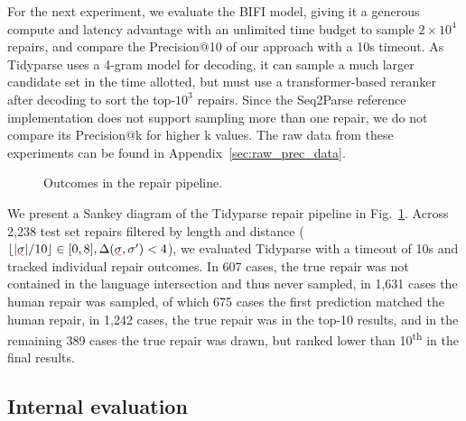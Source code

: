 \documentclass[sigplan,review,acmsmall,nonacm,screen,anonymous]{acmart}\settopmatter{printfolios=false,printccs=false,printacmref=false}
\begin{document}
For the next experiment, we evaluate the BIFI model, giving it a generous compute and latency advantage with an unlimited time budget to sample $2\times10^4$ repairs, and compare the Precision@10 of our approach with a 10s timeout. As Tidyparse uses a 4-gram model for decoding, it can sample a much larger candidate set in the time allotted, but must use a transformer-based reranker after decoding to sort the top-$10^3$ repairs. Since the Seq2Parse reference implementation does not support sampling more than one repair, we do not compare its Precision@k for higher k values. The raw data from these experiments can be found in Appendix~\ref{sec:raw_prec_data}.

\begin{figure}
\vspace{-1.13cm}
\begin{center}\resizebox{.43\textwidth}{!}{\hspace{-0.6cm}}\end{center}
\vspace{-1.1cm}
\caption{Outcomes in the repair pipeline.}
\label{fig:sankey}
\end{figure}

\noindent We present a Sankey diagram of the Tidyparse repair pipeline in Fig.~\ref{fig:sankey}. Across 2,238 test set repairs filtered by length and distance ($\lfloor|\err\sigma| / 10\rfloor \in [0, 8], \Delta(\err\sigma, \sigma') < 4$), we evaluated Tidyparse with a timeout of 10s and tracked individual repair outcomes. In 607 cases, the true repair was not contained in the language intersection and thus never sampled, in 1,631 cases the human repair was sampled, of which 675 cases the first prediction matched the human repair, in 1,242 cases, the true repair was in the top-10 results, and in the remaining 389 cases the true repair was drawn, but ranked lower than 10\textsuperscript{th} in the final results.

\clearpage\subsection{Internal evaluation}\label{sec:rq3}
\end{document}

